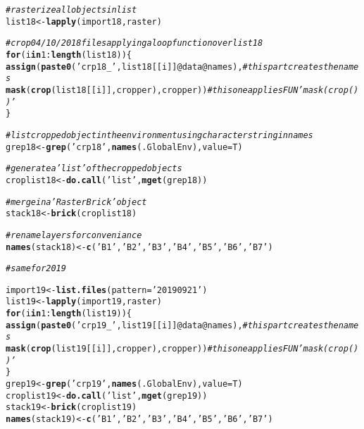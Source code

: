 \documentclass{article}\usepackage[]{graphicx}\usepackage[]{color}
\makeatletter
\newcommand{\hlnum}[1]{\textcolor[rgb]{0.686,0.059,0.569}{#1}}%
\newcommand{\hlstr}[1]{\textcolor[rgb]{0.192,0.494,0.8}{#1}}%
\newcommand{\hlcom}[1]{\textcolor[rgb]{0.678,0.584,0.686}{\textit{#1}}}%
\newcommand{\hlopt}[1]{\textcolor[rgb]{0,0,0}{#1}}%
\newcommand{\hlstd}[1]{\textcolor[rgb]{0.345,0.345,0.345}{#1}}%
\newcommand{\hlkwa}[1]{\textcolor[rgb]{0.161,0.373,0.58}{\textbf{#1}}}%
\newcommand{\hlkwb}[1]{\textcolor[rgb]{0.69,0.353,0.396}{#1}}%
\newcommand{\hlkwc}[1]{\textcolor[rgb]{0.333,0.667,0.333}{#1}}%
\newcommand{\hlkwd}[1]{\textcolor[rgb]{0.737,0.353,0.396}{\textbf{#1}}}%
\newenvironment{kframe}{%
 \def\at@end@of@kframe{}%
 \ifinner\ifhmode%
  \def\at@end@of@kframe{\end{minipage}}%
  \begin{minipage}{\columnwidth}%
 \fi\fi%
 \def\FrameCommand##1{\hskip\@totalleftmargin \hskip-\fboxsep
 \colorbox{shadecolor}{##1}\hskip-\fboxsep
     \hskip-\linewidth \hskip-\@totalleftmargin \hskip\columnwidth}%
 \MakeFramed {\advance\hsize-\width
   \@totalleftmargin\z@ \linewidth\hsize
   \@setminipage}}%
 {\par\unskip\endMakeFramed%
 \at@end@of@kframe}
\newenvironment{knitrout}{}{} %
\makeatother
\begin{document}
\begin{knitrout}
\begin{kframe}
\begin{alltt}
\hlcom{# rasterize all objects in list}
\hlstd{list18} \hlkwb{<-} \hlkwd{lapply}\hlstd{(import18, raster)}

\hlcom{# crop 04/10/2018 files applying a loop function over list18}
\hlkwa{for}\hlstd{(i} \hlkwa{in} \hlnum{1}\hlopt{:}\hlkwd{length}\hlstd{(list18))\{}
  \hlkwd{assign}\hlstd{(}\hlkwd{paste0}\hlstd{(}\hlstr{'crp18_'}\hlstd{, list18[[i]]}\hlopt{@}\hlkwc{data}\hlopt{@}\hlkwc{names}\hlstd{),}  \hlcom{# this part creates the names}
         \hlkwd{mask}\hlstd{(}\hlkwd{crop}\hlstd{(list18[[i]], cropper), cropper))} \hlcom{# this one applies FUN 'mask(crop())'}
\hlstd{\}}

\hlcom{# list cropped object in the environment using character string in names}
\hlstd{grep18} \hlkwb{<-} \hlkwd{grep}\hlstd{(}\hlstr{'crp18'}\hlstd{,} \hlkwd{names}\hlstd{(.GlobalEnv),} \hlkwc{value} \hlstd{= T)}

\hlcom{# generate a 'list' of the cropped objects}
\hlstd{croplist18} \hlkwb{<-} \hlkwd{do.call}\hlstd{(}\hlstr{'list'}\hlstd{,} \hlkwd{mget}\hlstd{(grep18))}

\hlcom{# merge in a 'RasterBrick' object}
\hlstd{stack18} \hlkwb{<-} \hlkwd{brick}\hlstd{(croplist18)}

\hlcom{# rename layers for conveniance}
\hlkwd{names}\hlstd{(stack18)} \hlkwb{<-} \hlkwd{c}\hlstd{(}\hlstr{'B1'}\hlstd{,}\hlstr{'B2'}\hlstd{,}\hlstr{'B3'}\hlstd{,}\hlstr{'B4'}\hlstd{,}\hlstr{'B5'}\hlstd{,}\hlstr{'B6'}\hlstd{,}\hlstr{'B7'}\hlstd{)}

\hlcom{# same for 2019}

\hlstd{import19} \hlkwb{<-} \hlkwd{list.files}\hlstd{(}\hlkwc{pattern} \hlstd{=} \hlstr{'20190921'}\hlstd{)}
\hlstd{list19} \hlkwb{<-} \hlkwd{lapply}\hlstd{(import19, raster)}
\hlkwa{for}\hlstd{(i} \hlkwa{in} \hlnum{1}\hlopt{:}\hlkwd{length}\hlstd{(list19))\{}
  \hlkwd{assign}\hlstd{(}\hlkwd{paste0}\hlstd{(}\hlstr{'crp19_'}\hlstd{, list19[[i]]}\hlopt{@}\hlkwc{data}\hlopt{@}\hlkwc{names}\hlstd{),}  \hlcom{# this part creates the names}
         \hlkwd{mask}\hlstd{(}\hlkwd{crop}\hlstd{(list19[[i]], cropper), cropper))} \hlcom{# this one applies FUN 'mask(crop())'}
\hlstd{\}}
\hlstd{grep19} \hlkwb{<-} \hlkwd{grep}\hlstd{(}\hlstr{'crp19'}\hlstd{,} \hlkwd{names}\hlstd{(.GlobalEnv),} \hlkwc{value} \hlstd{= T)}
\hlstd{croplist19} \hlkwb{<-} \hlkwd{do.call}\hlstd{(}\hlstr{'list'} \hlstd{,}\hlkwd{mget}\hlstd{(grep19))}
\hlstd{stack19} \hlkwb{<-} \hlkwd{brick}\hlstd{(croplist19)}
\hlkwd{names}\hlstd{(stack19)} \hlkwb{<-} \hlkwd{c}\hlstd{(}\hlstr{'B1'}\hlstd{,}\hlstr{'B2'}\hlstd{,}\hlstr{'B3'}\hlstd{,}\hlstr{'B4'}\hlstd{,}\hlstr{'B5'}\hlstd{,}\hlstr{'B6'}\hlstd{,}\hlstr{'B7'}\hlstd{)}


\end{alltt}
\end{kframe}
\end{knitrout}
\end{document}

